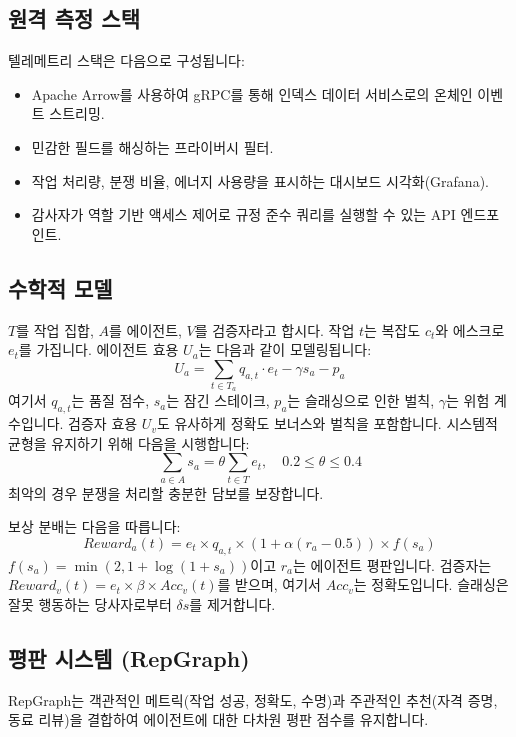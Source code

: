 \documentclass[11pt]{article}
\begin{document}
\subsection{원격 측정 스택}
텔레메트리 스택은 다음으로 구성됩니다:
\begin{itemize}[noitemsep]
  \item Apache Arrow를 사용하여 gRPC를 통해 인덱스 데이터 서비스로의 온체인 이벤트 스트리밍.
  \item 민감한 필드를 해싱하는 프라이버시 필터.
  \item 작업 처리량, 분쟁 비율, 에너지 사용량을 표시하는 대시보드 시각화(Grafana).
  \item 감사자가 역할 기반 액세스 제어로 규정 준수 쿼리를 실행할 수 있는 API 엔드포인트.
\end{itemize}

\subsection{수학적 모델}
$T$를 작업 집합, $A$를 에이전트, $V$를 검증자라고 합시다. 작업 $t$는 복잡도 $c_t$와 에스크로 $e_t$를 가집니다. 에이전트 효용 $U_a$는 다음과 같이 모델링됩니다:
\begin{equation}
U_a = \sum_{t \in T_a} q_{a,t}\cdot e_t - \gamma s_a - p_a\label{eq:agent-utility}
\end{equation}
여기서 $q_{a,t}$는 품질 점수, $s_a$는 잠긴 스테이크, $p_a$는 슬래싱으로 인한 벌칙, $\gamma$는 위험 계수입니다. 검증자 효용 $U_v$도 유사하게 정확도 보너스와 벌칙을 포함합니다. 시스템적 균형을 유지하기 위해 다음을 시행합니다:
\begin{equation}
\sum_{a \in A} s_a = \theta \sum_{t \in T} e_t,\quad 0.2 \leq \theta \leq 0.4
\end{equation}
최악의 경우 분쟁을 처리할 충분한 담보를 보장합니다.

보상 분배는 다음을 따릅니다:
\begin{equation}
Reward_a(t) = e_t \times q_{a,t} \times \left(1 + \alpha (r_a - 0.5)\right) \times f(s_a)
\end{equation}
$f(s_a) = \min(2, 1 + \log(1+s_a))$이고 $r_a$는 에이전트 평판입니다. 검증자는 $Reward_v(t) = e_t \times \beta \times Acc_v(t)$를 받으며, 여기서 $Acc_v$는 정확도입니다. 슬래싱은 잘못 행동하는 당사자로부터 $\delta s$를 제거합니다.

\subsection{평판 시스템 (RepGraph)}
\label{sec:reputation}
RepGraph는 객관적인 메트릭(작업 성공, 정확도, 수명)과 주관적인 추천(자격 증명, 동료 리뷰)을 결합하여 에이전트에 대한 다차원 평판 점수를 유지합니다.
\end{document}
